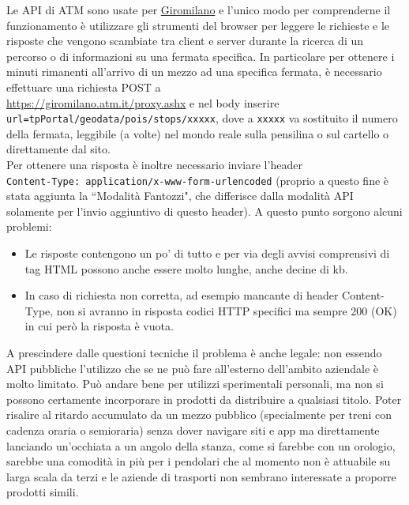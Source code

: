 \documentclass[12pt,a4paper]{report}
\begin{document}
Le API di ATM sono usate per \href{https://giromilano.atm.it}{Giromilano} e l'unico modo per comprenderne il funzionamento è utilizzare
gli strumenti del browser per leggere le richieste e le risposte che vengono scambiate tra client e server durante la ricerca di un
percorso o di informazioni su una fermata specifica.
In particolare per ottenere i minuti rimanenti all'arrivo di un mezzo ad una specifica fermata, è necessario effettuare una richiesta
POST a\\ \url{https://giromilano.atm.it/proxy.ashx} e nel body inserire\\ \texttt{url=tpPortal/geodata/pois/stops/xxxxx}, dove a
\texttt{xxxxx} va sostituito il numero della fermata, leggibile (a volte) nel mondo reale sulla pensilina o sul cartello o direttamente
dal sito.\\
Per ottenere una risposta è inoltre necessario inviare l'header\\ \texttt{Content-Type: application/x-www-form-urlencoded}
(proprio a questo fine è stata aggiunta la ``Modalità Fantozzi", che differisce dalla modalità API solamente per l'invio aggiuntivo
di questo header).
A questo punto sorgono alcuni problemi:
\begin{itemize}
  \item Le risposte contengono un po' di tutto e per via degli avvisi comprensivi di tag HTML possono anche essere molto lunghe, anche
        decine di kb.
  \item In caso di richiesta non corretta, ad esempio mancante di header Content-Type, non si avranno in risposta codici HTTP specifici
        ma sempre 200 (OK) in cui però la risposta è vuota.
\end{itemize}

A prescindere dalle questioni tecniche il problema è anche legale: non essendo API pubbliche l'utilizzo che se ne può fare all'esterno
dell'ambito aziendale è molto limitato. Può andare bene per utilizzi sperimentali personali, ma non si possono certamente incorporare
in prodotti da distribuire a qualsiasi titolo.
Poter risalire al ritardo accumulato da un mezzo pubblico (specialmente per treni con cadenza oraria o semioraria) senza dover navigare
siti e app ma direttamente lanciando un'occhiata a un angolo della stanza, come si farebbe con un orologio, sarebbe una comodità in più
per i pendolari che al momento non è attuabile su larga scala da terzi e le aziende di trasporti non sembrano interessate a proporre
prodotti simili.
\end{document}
